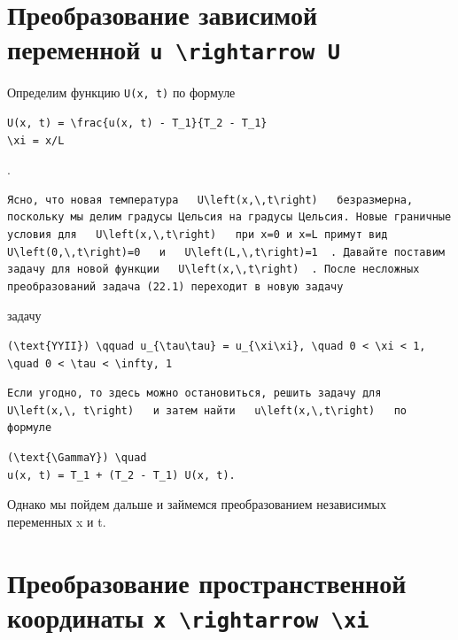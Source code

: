 \documentclass[
  ukrainian,
]{article}
\begin{document}
\section{\texorpdfstring{Преобразование зависимой переменной
\texttt{u\ \textbackslash{}rightarrow\ U}}{Преобразование зависимой переменной u \textbackslash rightarrow U}}\label{ux43fux440ux435ux43eux431ux440ux430ux437ux43eux432ux430ux43dux438ux435-ux437ux430ux432ux438ux441ux438ux43cux43eux439-ux43fux435ux440ux435ux43cux435ux43dux43dux43eux439-u-rightarrow-u}

Определим функцию \texttt{U(x,\ t)} по формуле

\begin{verbatim}
U(x, t) = \frac{u(x, t) - T_1}{T_2 - T_1}
\xi = x/L
\end{verbatim}

.

\begin{verbatim}
Ясно, что новая температура   U\left(x,\,t\right)   безразмерна, поскольку мы делим градусы Цельсия на градусы Цельсия. Новые граничные условия для   U\left(x,\,t\right)   при x=0 и x=L примут вид   U\left(0,\,t\right)=0   и   U\left(L,\,t\right)=1  . Давайте поставим задачу для новой функции   U\left(x,\,t\right)  . После несложных преобразований задача (22.1) переходит в новую задачу
\end{verbatim}

задачу

\begin{verbatim}
(\text{YYII}) \qquad u_{\tau\tau} = u_{\xi\xi}, \quad 0 < \xi < 1, \quad 0 < \tau < \infty, 1
\end{verbatim}

\begin{verbatim}
Если угодно, то здесь можно остановиться, решить задачу для   U\left(x,\, t\right)   и затем найти   u\left(x,\,t\right)   по формуле
\end{verbatim}

\begin{verbatim}
(\text{\GammaY}) \quad
u(x, t) = T_1 + (T_2 - T_1) U(x, t).
\end{verbatim}

Однако мы пойдем дальше и займемся преобразованием независимых
переменных x и t.

\section{\texorpdfstring{Преобразование пространственной координаты
\texttt{x\ \textbackslash{}rightarrow\ \textbackslash{}xi}}{Преобразование пространственной координаты x \textbackslash rightarrow \textbackslash xi}}\label{ux43fux440ux435ux43eux431ux440ux430ux437ux43eux432ux430ux43dux438ux435-ux43fux440ux43eux441ux442ux440ux430ux43dux441ux442ux432ux435ux43dux43dux43eux439-ux43aux43eux43eux440ux434ux438ux43dux430ux442ux44b-x-rightarrow-xi}
\end{document}
